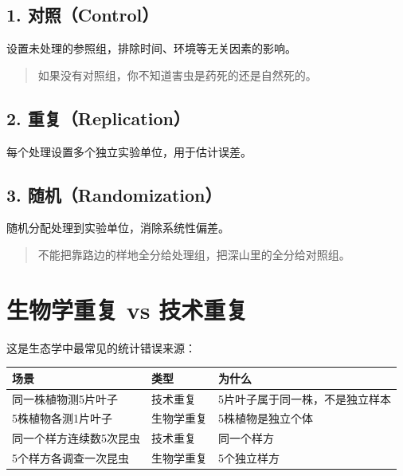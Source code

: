 \documentclass[
  letterpaper,
]{scrbook}
\newcounter{none} %
\begin{document}
\subsection{1. 对照（Control）}\label{ux5bf9ux7167control}

设置未处理的参照组，排除时间、环境等无关因素的影响。

\begin{quote}
如果没有对照组，你不知道害虫是药死的还是自然死的。
\end{quote}

\subsection{2. 重复（Replication）}\label{ux91cdux590dreplication}

每个处理设置多个独立实验单位，用于估计误差。

\subsection{3. 随机（Randomization）}\label{ux968fux673arandomization}

随机分配处理到实验单位，消除系统性偏差。

\begin{quote}
不能把靠路边的样地全分给处理组，把深山里的全分给对照组。
\end{quote}

\section{生物学重复 vs
技术重复}\label{ux751fux7269ux5b66ux91cdux590d-vs-ux6280ux672fux91cdux590d}

这是生态学中最常见的统计错误来源：

{\def\LTcaptype{none} %
\begin{longtable}[]{@{}lll@{}}
\toprule\noalign{}
场景 & 类型 & 为什么 \\
\midrule\noalign{}
\endhead
\bottomrule\noalign{}
\endlastfoot
同一株植物测5片叶子 & 技术重复 & 5片叶子属于同一株，不是独立样本 \\
5株植物各测1片叶子 & 生物学重复 & 5株植物是独立个体 \\
同一个样方连续数5次昆虫 & 技术重复 & 同一个样方 \\
5个样方各调查一次昆虫 & 生物学重复 & 5个独立样方 \\
\end{longtable}
}
\end{document}
